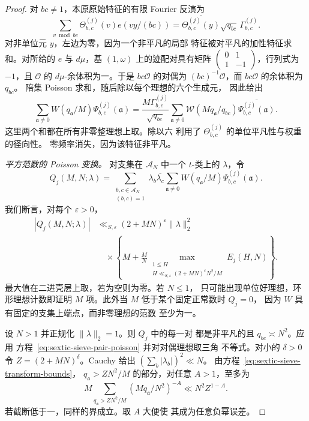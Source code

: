 \begin{proof}
对 $bc\ne1$，本原原始特征的有限 Fourier 反演为
\[
 \sum_{v\bmod bc}\Theta_{b,c}^{(j)}(v)e(vy/(bc))
 =\overline{\Theta_{b,c}^{(j)}(y)}\sqrt{q_{bc}}\,
       \Gamma_{b,c}^{(j)}.
\]
对非单位元 $y$，左边为零，因为一个非平凡的局部
特征被对平凡的加性特征求和。对所给的
$e$ 与 $d\mu$，基 $(1,\omega)$ 上的迹配对具有矩阵
$\left(\begin{smallmatrix}0&1\\1&-1\end{smallmatrix}\right)$，行列式为
$-1$，且 $\mathcal O$ 的 $d\mu$-余体积为一。于是
$bc\mathcal O$ 的对偶为 $(bc)^{-1}\mathcal O$，而
$bc\mathcal O$ 的余体积为 $q_{bc}$。
陪集 Poisson 求和，随后除以每个理想的六个生成元，
因此给出
\begin{equation}\label{eq:sextic-sieve-pair-poisson}
 \sum_{\mathfrak a\ne0}W(q_{\mathfrak a}/M)\Psi_{b,c}^{(j)}(\mathfrak a)
 =\frac{M\Gamma_{b,c}^{(j)}}{\sqrt{q_{bc}}}
   \sum_{\mathfrak a\ne0}\mathscr W(Mq_{\mathfrak a}/q_{bc})
                 \overline{\Psi_{b,c}^{(j)}(\mathfrak a)}.
\end{equation}
这里两个和都在所有非零整理想上取。除以六
利用了 $\Theta_{b,c}^{(j)}$ 的单位平凡性与权重的径向性。
零频率消失，因为该特征非平凡。

\medskip\noindent\emph{平方范数的 Poisson 变换。}
对支集在 $\mathcal A_N$ 中一个 $t$-类上的 $\lambda$，令
\[
 Q_j(M,N;\lambda)=
 \sum_{\substack{b,c\in\mathcal A_N\\(b,c)=1}}
   \lambda_b\overline{\lambda_c}
   \sum_{\mathfrak a\ne0}W(q_{\mathfrak a}/M)
                         \Psi_{b,c}^{(j)}(\mathfrak a).
\]
我们断言，对每个 $\varepsilon>0$，
\begin{equation}\label{eq:sextic-sieve-pair-norm}
 \begin{split}
 |Q_j(M,N;\lambda)|
 &\ll_{S,\varepsilon}(2+MN)^\varepsilon\|\lambda\|_2^2\\
 &\quad\times
 \left\{M+\frac MN
   \max_{\substack{1\le H\\
       H\ll_{S,\varepsilon}(2+MN)^\varepsilon N^2/M}}
       E_j(H,N)\right\}.
 \end{split}
\end{equation}
最大值在二进壳层上取，若为空则为零。若 $N\le1$，
只可能出现单位好理想，环形理想计数即证明
$M$ 项。此外当 $M$ 低于某个固定正常数时 $Q_j=0$，
因为 $W$ 具有固定的支集上端点，而非零理想的范数
至少为一。

设 $N>1$ 并正规化 $\|\lambda\|_2=1$。则 $Q_j$ 中的每一对
都是非平凡的且 $q_{bc}\asymp N^2$。应用
方程~\eqref{eq:sextic-sieve-pair-poisson} 并对对偶理想取三角
不等式。对小的 $\delta>0$ 令
$Z=(2+MN)^\delta$。Cauchy 给出 $(\sum_b|\lambda_b|)^2\ll N$。
由方程~\eqref{eq:sextic-sieve-transform-bounds}，
$q_{\mathfrak a}>ZN^2/M$ 的部分，对任意 $A>1$，至多为
\[
 M\sum_{q_{\mathfrak a}>ZN^2/M}(Mq_{\mathfrak a}/N^2)^{-A}
 \ll N^2Z^{1-A}.
\]
若截断低于一，同样的界成立。取 $A$ 大便使
其成为任意负幂误差。


\end{proof}
